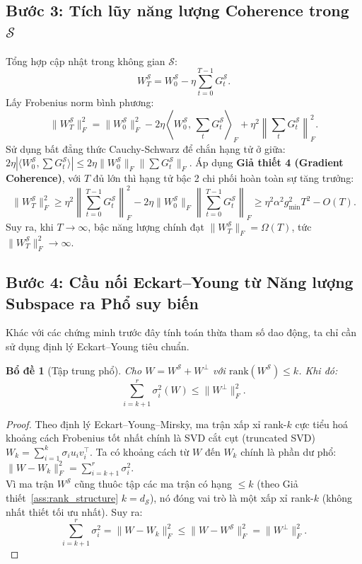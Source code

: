 \documentclass[11pt,a4paper]{article}
\newtheorem{lemma}{Bổ đề}
\newcommand{\rank}{\mathrm{rank}}
\newcommand{\cS}{\mathcal{S}}
\begin{document}
\subsection{Bước 3: Tích lũy năng lượng Coherence trong $\cS$}

Tổng hợp cập nhật trong không gian $\cS$:
\[
W_T^{\cS} = W_0^{\cS} - \eta \sum_{t=0}^{T-1} G_t^{\cS}.
\]
Lấy Frobenius norm bình phương:
\[
\|W_T^{\cS}\|_F^2 = \|W_0^{\cS}\|_F^2 - 2\eta \left\langle W_0^{\cS},\, \sum_t G_t^{\cS}\right\rangle_F + \eta^2 \left\|\sum_t G_t^{\cS}\right\|_F^2.
\]
Sử dụng bất đẳng thức Cauchy-Schwarz để chắn hạng tử ở giữa: $2\eta |\langle W_0^\cS, \sum G_t^\cS \rangle| \le 2\eta \|W_0^\cS\|_F \|\sum G_t^\cS\|_F$.
Áp dụng \textbf{Giả thiết 4 (Gradient Coherence)}, với $T$ đủ lớn thì hạng tử bậc 2 chi phối hoàn toàn sự tăng trưởng:
\[
\|W_T^{\cS}\|_F^2 \geq \eta^2 \left\|\sum_{t=0}^{T-1} G_t^{\cS}\right\|_F^2 - 2\eta \|W_0^{\cS}\|_F \left\|\sum_{t=0}^{T-1} G_t^{\cS}\right\|_F \geq \eta^2 \alpha^2 g_{\min}^2 T^2 - O(T).
\]
Suy ra, khi $T \to \infty$, bậc năng lượng chính đạt $\|W_T^{\cS}\|_F = \Omega(T)$, tức $\|W_T^{\cS}\|_F^2 \to \infty$.

\subsection{Bước 4: Cầu nối Eckart--Young từ Năng lượng Subspace ra Phổ suy biến}

Khác với các chứng minh trước đây tính toán thừa tham số dao động, ta chỉ cần sử dụng định lý Eckart--Young tiêu chuẩn.

\begin{lemma}[Tập trung phổ]
\label{lem:energy_to_spectral}
Cho $W = W^{\cS} + W^{\perp}$ với $\rank(W^{\cS}) \leq k$. Khi đó:
\[
\sum_{i=k+1}^{r} \sigma_i^2(W) \leq \|W^{\perp}\|_F^2.
\]
\end{lemma}
\begin{proof}
Theo định lý Eckart--Young--Mirsky, ma trận xấp xỉ rank-$k$ cực tiểu hoá khoảng cách Frobenius tốt nhất chính là SVD cắt cụt (truncated SVD) $W_k = \sum_{i=1}^k \sigma_i u_i v_i^\top$. Ta có khoảng cách từ $W$ đến $W_k$ chính là phần dư phổ: $\|W - W_k\|_F^2 = \sum_{i=k+1}^r \sigma_i^2$. \\
Vì ma trận $W^{\cS}$ cũng thuôc tập các ma trận có hạng $\leq k$ (theo Giả thiết~\ref{ass:rank_structure} $k=d_{\cS}$), nó đóng vai trò là một xấp xỉ rank-$k$ (không nhất thiết tối ưu nhất). Suy ra:
\[
\sum_{i=k+1}^r \sigma_i^2 = \|W - W_k\|_F^2 \leq \|W - W^{\cS}\|_F^2 = \|W^{\perp}\|_F^2.
\]
\end{proof}
\end{document}
